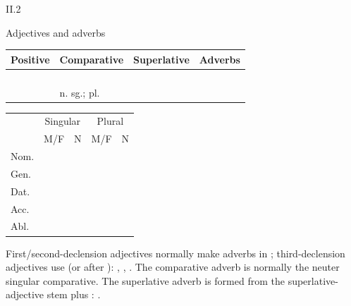 \begin{courseunit}{II.2}
\begin{grammarbox}{Adjectives and adverbs}
\begin{center}
\begin{tabular}{@{}llll@{}}
\toprule
Positive & Comparative & Superlative & Adverbs\\ \midrule
\Latin{bonus} & \Latin{melior, melius} & \Latin{optimus} &
  \Latin{bene, melius, optime}\\
\Latin{malus} & \Latin{peior, peius} & \Latin{pessimus} &
  \Latin{male, peius, pessime}\\
\Latin{magnus} & \Latin{maior, maius} & \Latin{maximus} &
  \Latin{magnopere, magis, maxime}\\
\Latin{parvus} & \Latin{minor, minus} & \Latin{minimus} &
  \Latin{paulum, minus, minime}\\
\Latin{multus} & \Latin{plus, pluris} n. sg.; \Latin{plures, plura} pl. & \Latin{plurimus} &
  \Latin{multum, plus, plurimum}\\
\bottomrule
\end{tabular}
\end{center}

\begin{center}
\begin{tabular}{@{}l*{2}{c}@{\qquad}*{2}{c}@{}}
\toprule
& \multicolumn{2}{c}{Singular} & \multicolumn{2}{c}{Plural}\\
& M/F & N & M/F & N\\ \midrule
Nom. & \Latin{-ior} & \Latin{-ius} & \Latin{-iores} & \Latin{-iora}\\
Gen. & \multicolumn{2}{c}{\Latin{-ioris}} & \multicolumn{2}{c}{\Latin{-iorum}}\\
Dat. & \multicolumn{2}{c}{\Latin{-iori}} & \multicolumn{2}{c}{\Latin{-ioribus}}\\
Acc. & \Latin{-iorem} & \Latin{-ius} & \Latin{-iores} & \Latin{-iora}\\
Abl. & \multicolumn{2}{c}{\Latin{-iore}} & \multicolumn{2}{c}{\Latin{-ioribus}}\\
\bottomrule
\end{tabular}
\end{center}

First/second-declension adjectives normally make adverbs in ; third-declension
adjectives use  (or  after ): ,
, . The comparative adverb is normally the
neuter singular comparative. The superlative adverb is formed from the
superlative-adjective stem plus : .
\end{grammarbox}


\end{courseunit}
